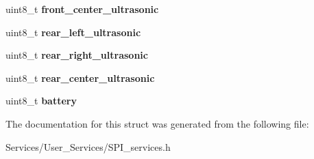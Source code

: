 \begin{DoxyCompactItemize}
uint8\+\_\+t {\bfseries front\+\_\+center\+\_\+ultrasonic}
\item 
\mbox{\label{struct_octets_frame___typedef_a8007022ee9ef4013b0cd17c8fea23d35}} 
uint8\+\_\+t {\bfseries rear\+\_\+left\+\_\+ultrasonic}
\item 
\mbox{\label{struct_octets_frame___typedef_a28e44c9de4ac244a8450095ae356e345}} 
uint8\+\_\+t {\bfseries rear\+\_\+right\+\_\+ultrasonic}
\item 
\mbox{\label{struct_octets_frame___typedef_aa211e19d6c5a23b9eca397d4818e93fc}} 
uint8\+\_\+t {\bfseries rear\+\_\+center\+\_\+ultrasonic}
\item 
\mbox{\label{struct_octets_frame___typedef_a89e04157c4e1f65c9ab63bffa365c8a6}} 
uint8\+\_\+t {\bfseries battery}
\end{DoxyCompactItemize}


The documentation for this struct was generated from the following file\+:\begin{DoxyCompactItemize}
\item 
Services/\+User\+\_\+\+Services/S\+P\+I\+\_\+services.\+h\end{DoxyCompactItemize}
